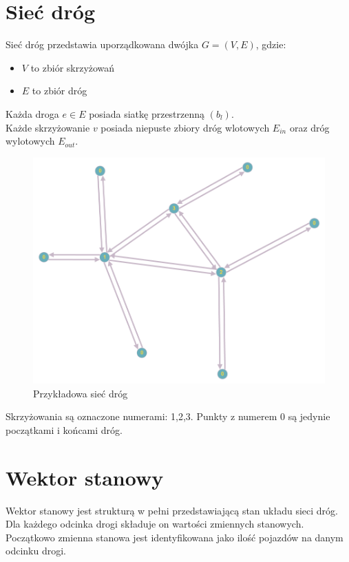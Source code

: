 \documentclass[12pt]{book}
\theoremstyle{plain}
\begin{document}
\section{Sieć dróg}
Sieć dróg przedstawia uporządkowana dwójka $G=(V,E)$, gdzie:
\begin{itemize}
	\item $V$ to zbiór skrzyżowań
	\item $E$ to zbiór dróg
\end{itemize}
Każda droga $e \in E$ posiada siatkę przestrzenną $(b_l)$.\\
Każde skrzyżowanie $v$ posiada niepuste zbiory dróg wlotowych $E_{in}$ oraz dróg wylotowych $E_{out}$.\\
\begin{minipage}{12cm}
	\begin{figure}[H]
		\includegraphics[width=12cm]{network}
		\caption{\label{fig:network} Przykładowa sieć dróg}
	\end{figure}
\end{minipage} \hfill
\begin{minipage}{5cm}
	Skrzyżowania są oznaczone numerami: 1,2,3.
	Punkty z numerem 0 są jedynie początkami i końcami dróg.
\end{minipage}
 \noindent
\section{Wektor stanowy}
Wektor stanowy jest strukturą w pełni przedstawiającą stan układu sieci dróg. Dla każdego odcinka drogi składuje on wartości zmiennych stanowych. Początkowo zmienna stanowa jest identyfikowana jako ilość pojazdów na danym odcinku drogi. 
\end{document}
